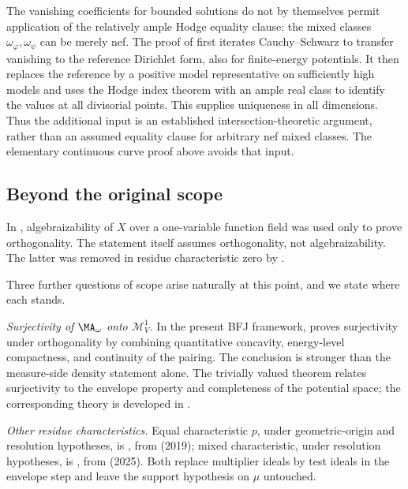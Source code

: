\begin{remark}
\label{rem:ch28-uniqueness-gap}
The vanishing coefficients for bounded solutions do not by themselves
permit application of the relatively ample Hodge equality clause:
the mixed classes $\omega_\varphi,\omega_\psi$ can be merely nef.
The proof of \cite[Proposition~8.2]{BFJ15} first iterates
Cauchy--Schwarz to transfer vanishing to the reference Dirichlet form,
also for finite-energy potentials.  It then replaces the reference by
a positive model representative on sufficiently high models and uses
the Hodge index theorem with an ample real class to identify the
values at all divisorial points.  This supplies uniqueness in all
dimensions.  Thus the additional input is an established
intersection-theoretic argument, rather than an assumed equality
clause for arbitrary nef mixed classes.  The elementary continuous
curve proof above avoids that input.
\end{remark}

\subsection{Beyond the original scope}
\label{sec:ch28-surjectivity}

In \cite{BFJ15}, algebraizability of $X$ over a one-variable function
field was used only to prove orthogonality.  The statement
 itself assumes orthogonality, not
algebraizability.  The latter was removed in residue characteristic zero by
\cite[Theorem~6.3.3 and Corollary~6.3.4]{BGGJKM20}.

Three further questions of scope arise naturally at this point, and we state
where each stands.

\emph{Surjectivity of $\MA_\omega$ onto $\mathcal M^1_V$.}
In the present BFJ framework, 
proves surjectivity under orthogonality by combining quantitative
concavity, energy-level compactness, and continuity of the pairing.
The conclusion is stronger than the measure-side density statement
alone.  The trivially valued theorem \cite[Theorem~12.8]{BJ22} relates
surjectivity to the envelope property and completeness of the potential
space; the corresponding theory is developed in
.

\emph{Other residue characteristics.}  Equal characteristic $p$, under
geometric-origin and resolution hypotheses, is
, from \cite{GJKM19} (2019);
mixed characteristic, under resolution hypotheses, is
, from \cite{FGK25} (2025).  Both
replace multiplier ideals by test ideals in the envelope step and leave the
support hypothesis on $\mu$ untouched.

